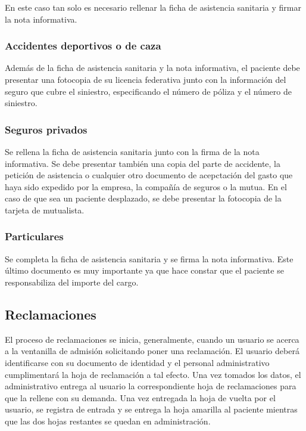 En este caso tan solo es necesario rellenar la ficha de asistencia sanitaria y firmar la nota informativa.

\subsubsection{Accidentes deportivos o de caza}

Además de la ficha de asistencia sanitaria y la nota informativa, el paciente debe presentar una fotocopia de su licencia federativa junto con la información del seguro que cubre el siniestro, especificando el número de póliza y el número de siniestro.

\subsubsection{Seguros privados}

Se rellena la ficha de asistencia sanitaria junto con la firma de la nota informativa.
Se debe presentar también una copia del parte de accidente, la petición de asistencia o cualquier otro documento de acepctación del gasto que haya sido expedido por la empresa, la compañía de seguros o la mutua.
En el caso de que sea un paciente desplazado, se debe presentar la fotocopia de la tarjeta de mutualista.

\subsubsection{Particulares}

Se completa la ficha de asistencia sanitaria y se firma la nota informativa. Este último documento es muy importante ya que hace constar que el paciente se responsabiliza del importe del cargo.

\subsection{Reclamaciones}

El proceso de reclamaciones se inicia, generalmente, cuando un usuario se acerca a la ventanilla de admisión solicitando poner una reclamación.
El usuario deberá identificarse con su documento de identidad y el personal administrativo cumplimentará la hoja de reclamación a tal efecto.
Una vez tomados los datos, el administrativo entrega al usuario la correspondiente hoja de reclamaciones para que la rellene con su demanda.
Una vez entregada la hoja de vuelta por el usuario, se registra de entrada y se entrega la hoja amarilla al paciente mientras que las dos hojas restantes se quedan en administración.

